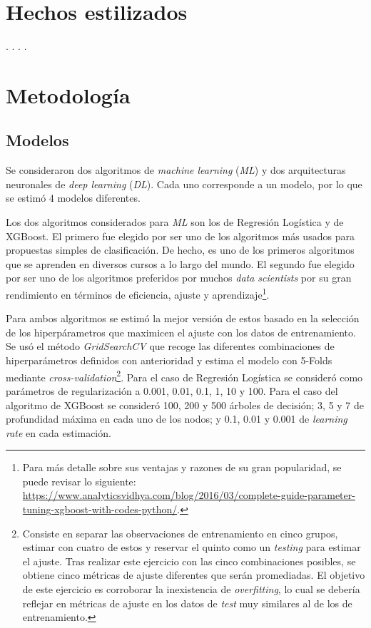\section{Hechos estilizados}
.
.
.
.

\section{Metodología}


\subsection{Modelos}
Se consideraron dos algoritmos de \textit{machine learning} (\textit{ML}) y dos  arquitecturas neuronales de \textit{deep learning} (\textit{DL}). Cada uno corresponde a un modelo, por lo que se estimó 4 modelos diferentes.

Los dos algoritmos considerados para \textit{ML} son los de Regresión Logística y de XGBoost. El primero fue elegido por ser uno de los algoritmos más usados para propuestas simples de clasificación. De hecho, es uno de los primeros algoritmos que se aprenden en diversos cursos a lo largo del mundo. El segundo fue elegido por ser uno de los algoritmos preferidos por muchos \textit{data scientists} por su gran rendimiento en términos de eficiencia, ajuste y aprendizaje\footnote{Para más detalle sobre sus ventajas y razones de su gran popularidad, se puede revisar lo siguiente: \url{https://www.analyticsvidhya.com/blog/2016/03/complete-guide-parameter-tuning-xgboost-with-codes-python/}.}.

Para ambos algoritmos se estimó la mejor versión de estos basado en la selección de los hiperpárametros que maximicen el ajuste con los datos de entrenamiento. Se usó el método \textit{GridSearchCV} que recoge las diferentes combinaciones de hiperparámetros definidos con anterioridad y estima el modelo con 5-Folds mediante \textit{cross-validation}\footnote{Consiste en separar las observaciones de entrenamiento en cinco grupos, estimar con cuatro de estos y reservar el quinto como un \textit{testing} para estimar el ajuste. Tras realizar este ejercicio con las cinco combinaciones posibles, se obtiene cinco métricas de ajuste diferentes que serán promediadas. El objetivo de este ejercicio es corroborar la inexistencia de \textit{overfitting}, lo cual se debería reflejar en métricas de ajuste en los datos de \textit{test} muy similares al de los de entrenamiento.}. Para el caso de Regresión Logística se consideró como parámetros de regularización a 0.001, 0.01, 0.1, 1, 10 y 100. Para el caso del algoritmo de XGBoost se consideró 100, 200 y 500 árboles de decisión; 3, 5 y 7 de profundidad máxima en cada uno de los nodos; y 0.1, 0.01 y 0.001 de \textit{learning rate} en cada estimación.

